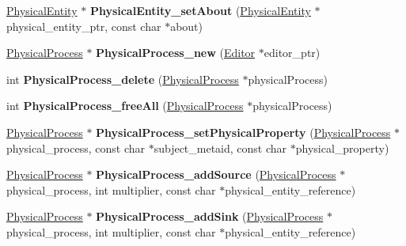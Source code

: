 \begin{DoxyCompactItemize}
\item 
\mbox{\label{namespaceomexmeta_a971552a103140035279fa2eb0b402fc0}} 
\hyperlink{classomexmeta_1_1PhysicalEntity}{Physical\+Entity} $\ast$ {\bfseries Physical\+Entity\+\_\+set\+About} (\hyperlink{classomexmeta_1_1PhysicalEntity}{Physical\+Entity} $\ast$physical\+\_\+entity\+\_\+ptr, const char $\ast$about)
\item 
\mbox{\label{namespaceomexmeta_a4b7cef4fcdbd4502c94b18da2f85470f}} 
\hyperlink{classomexmeta_1_1PhysicalProcess}{Physical\+Process} $\ast$ {\bfseries Physical\+Process\+\_\+new} (\hyperlink{classomexmeta_1_1Editor}{Editor} $\ast$editor\+\_\+ptr)
\item 
\mbox{\label{namespaceomexmeta_a97146d9b855c53650e54c471f053a4dc}} 
int {\bfseries Physical\+Process\+\_\+delete} (\hyperlink{classomexmeta_1_1PhysicalProcess}{Physical\+Process} $\ast$physical\+Process)
\item 
\mbox{\label{namespaceomexmeta_a3ccca8297fc991baf57065570938ed84}} 
int {\bfseries Physical\+Process\+\_\+free\+All} (\hyperlink{classomexmeta_1_1PhysicalProcess}{Physical\+Process} $\ast$physical\+Process)
\item 
\mbox{\label{namespaceomexmeta_ae0e715da1275124448d22005f2848722}} 
\hyperlink{classomexmeta_1_1PhysicalProcess}{Physical\+Process} $\ast$ {\bfseries Physical\+Process\+\_\+set\+Physical\+Property} (\hyperlink{classomexmeta_1_1PhysicalProcess}{Physical\+Process} $\ast$physical\+\_\+process, const char $\ast$subject\+\_\+metaid, const char $\ast$physical\+\_\+property)
\item 
\mbox{\label{namespaceomexmeta_a08408524a5a4f75ae4b0c1c8cad6c28e}} 
\hyperlink{classomexmeta_1_1PhysicalProcess}{Physical\+Process} $\ast$ {\bfseries Physical\+Process\+\_\+add\+Source} (\hyperlink{classomexmeta_1_1PhysicalProcess}{Physical\+Process} $\ast$physical\+\_\+process, int multiplier, const char $\ast$physical\+\_\+entity\+\_\+reference)
\item 
\mbox{\label{namespaceomexmeta_a68d8b919e923231d8a17e3506dca393b}} 
\hyperlink{classomexmeta_1_1PhysicalProcess}{Physical\+Process} $\ast$ {\bfseries Physical\+Process\+\_\+add\+Sink} (\hyperlink{classomexmeta_1_1PhysicalProcess}{Physical\+Process} $\ast$physical\+\_\+process, int multiplier, const char $\ast$physical\+\_\+entity\+\_\+reference)

\end{DoxyCompactItemize}
